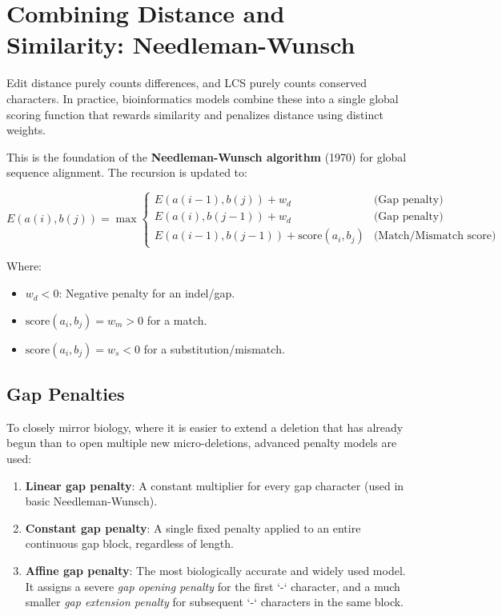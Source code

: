 \section{Combining Distance and Similarity: Needleman-Wunsch}

Edit distance purely counts differences, and LCS purely counts conserved characters. In practice, bioinformatics models combine these into a single global scoring function that rewards similarity and penalizes distance using distinct weights.

This is the foundation of the \textbf{Needleman-Wunsch algorithm} (1970) for global sequence alignment. The recursion is updated to:

\[
E(a(i), b(j)) = \max 
\begin{cases} 
E(a(i-1), b(j)) + w_d & \text{(Gap penalty)} \\
E(a(i), b(j-1)) + w_d & \text{(Gap penalty)} \\
E(a(i-1), b(j-1)) + \text{score}(a_i, b_j) & \text{(Match/Mismatch score)}
\end{cases}
\]

Where:
\begin{itemize}
    \item $w_d < 0$: Negative penalty for an indel/gap.
    \item $\text{score}(a_i, b_j) = w_m > 0$ for a match.
    \item $\text{score}(a_i, b_j) = w_s < 0$ for a substitution/mismatch.
\end{itemize}

\subsection{Gap Penalties}
To closely mirror biology, where it is easier to extend a deletion that has already begun than to open multiple new micro-deletions, advanced penalty models are used:
\begin{enumerate}
    \item \textbf{Linear gap penalty}: A constant multiplier for every gap character (used in basic Needleman-Wunsch).
    \item \textbf{Constant gap penalty}: A single fixed penalty applied to an entire continuous gap block, regardless of length.
    \item \textbf{Affine gap penalty}: The most biologically accurate and widely used model. It assigns a severe \textit{gap opening penalty} for the first `-` character, and a much smaller \textit{gap extension penalty} for subsequent `-` characters in the same block.
\end{enumerate}

